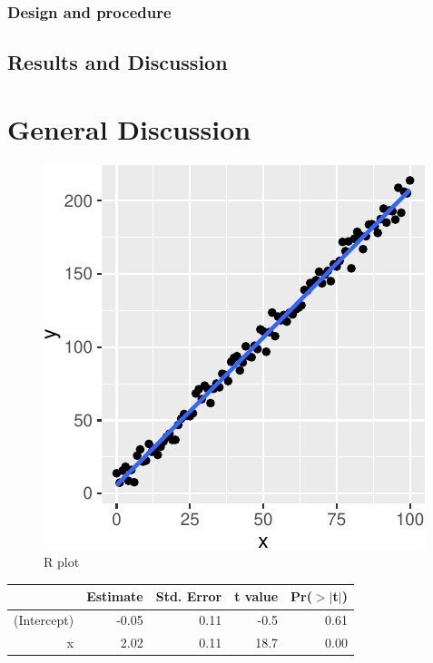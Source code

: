 \documentclass[10pt, letterpaper]{article}
\newenvironment{CodeChunk}{}{}
\begin{document}
\subsubsection{Design and procedure}\label{design-and-procedure-2}

\subsection{Results and Discussion}\label{results-and-discussion-2}

\section{General Discussion}\label{general-discussion}

\begin{CodeChunk}
\begin{figure}[H]
\includegraphics{figs/plot-1} \caption[R plot]{R plot}\label{fig:plot}
\end{figure}
\end{CodeChunk}

\begin{table}[H]
\centering
\begin{tabular}{rrrrr}
  \hline
 & Estimate & Std. Error & t value & Pr($>$$|$t$|$) \\ 
  \hline
(Intercept) & -0.05 & 0.11 & -0.5 & 0.61 \\ 
  x & 2.02 & 0.11 & 18.7 & 0.00 \\ 
   \hline
\end{tabular}
\end{table}
\end{document}
